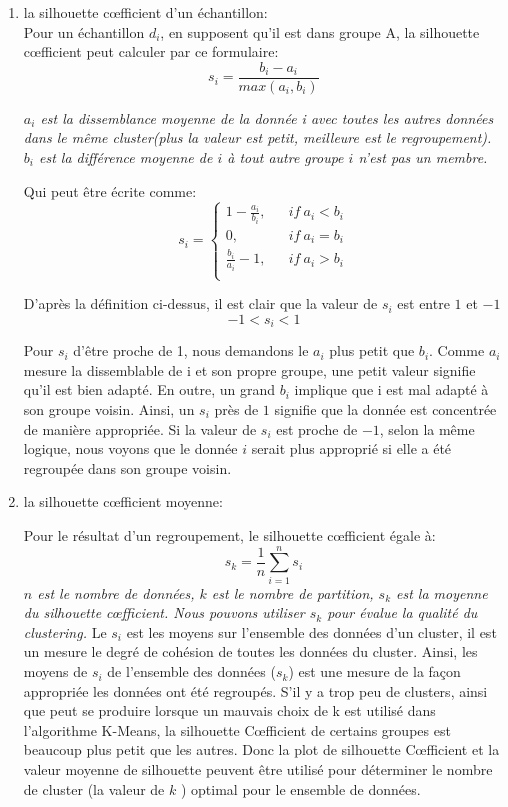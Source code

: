 \begin{enumerate}
\item la silhouette c\oe fficient d'un échantillon:\\

 Pour un échantillon $d_{i}$, en supposent qu'il est dans groupe A, la silhouette c\oe fficient peut calculer par ce formulaire:
$$s_{i}=\frac{b_{i}-a_{i}}{max(a_{i},b_{i})} $$

\emph{$a_{i}$ est la dissemblance moyenne de la donnée i avec toutes les autres données dans le même cluster(plus la valeur est petit, meilleure est le regroupement). $b_{i}$ est la différence moyenne de $i$ à tout autre groupe $i$ n'est pas un membre.}
\newpage

Qui peut être écrite comme:
$$  s_{i}=\left\{
\begin{array}{rcl}
1-\frac{a_{i}}{b_{i}},       &      & if\  a_{i}<b_{i}\\
0,     &      & if\ a_{i}=b_{i}\\
\frac{b_{i}}{a_{i}}-1,     &      & if\ a_{i}>b_{i}\\
\end{array} \right. $$

D'après la définition ci-dessus, il est clair que la valeur de $s_{i}$ est entre $1$ et $-1$
$$-1<s_{i}<1$$

Pour $s_{i}$ d'être proche de 1, nous demandons le $a_{i}$ plus petit que $b_{i}$. Comme $a_{i}$ mesure la dissemblable de i et son propre groupe, une petit valeur signifie qu'il est bien adapté. En outre, un grand $b_{i}$ implique que i est mal adapté à son groupe voisin. Ainsi, un $s_{i}$ près de $1$ signifie que la donnée est concentrée de manière appropriée. Si la valeur de $s_{i}$ est proche de $-1$, selon la même logique, nous voyons que le donnée $i$ serait plus approprié si elle a été regroupée dans son groupe voisin.

\item la silhouette c\oe fficient moyenne:

Pour le résultat d'un regroupement, le silhouette c\oe fficient égale à:
$$s_{k}=\frac{1}{n}\sum_{i=1}^n s_{i}$$
\emph{$n$ est le nombre de données, $k$ est le nombre de partition, $s_{k}$ est la moyenne du silhouette c\oe fficient. Nous pouvons utiliser $s_{k}$ pour évalue la qualité du clustering.}
\newline
\newline
Le $s_{i}$ est les moyens sur l'ensemble des données d'un cluster, il est un mesure le degré de cohésion de toutes les données du cluster. Ainsi, les moyens de $s_{i}$ de l'ensemble des données ($s_{k}$) est une mesure de la façon appropriée les données ont été regroupés. S'il y a trop peu de clusters, ainsi que peut se produire lorsque un mauvais choix de k est utilisé dans l'algorithme K-Means, la silhouette C\oe fficient de certains groupes est beaucoup plus petit que les autres. Donc la plot de silhouette C\oe fficient et la valeur moyenne de silhouette peuvent être utilisé pour déterminer le nombre de cluster (la valeur de $k$ ) optimal pour le ensemble de données.
\end{enumerate} 

